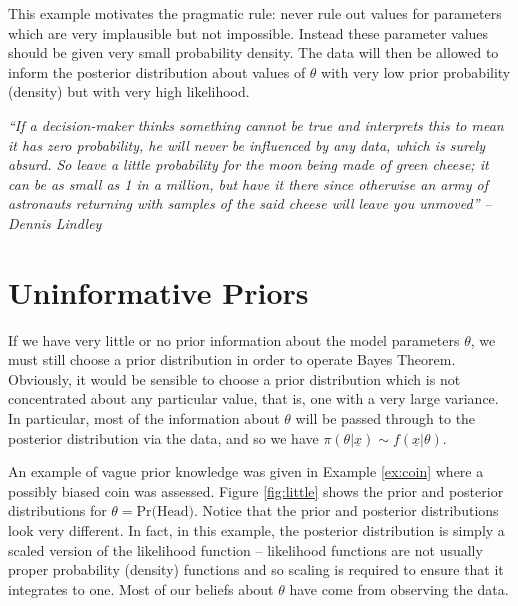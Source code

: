 This example motivates the pragmatic rule:
never rule out values for parameters which are very implausible but not impossible.
Instead these parameter values should be given very small probability density.
The data will then be allowed to inform the posterior distribution about values of $\theta$
with very low prior probability (density) but with very high likelihood.

\begin{tcolorbox}[colback=niceblue, colframe=niceblue]
\noindent \textit{``If a decision-maker thinks something cannot be true and interprets this to mean it has zero probability, he will never be influenced by any data, which is surely absurd. So leave a little probability for the moon being made of green cheese; it can be as small as 1 in a million, but have it there since otherwise an army of astronauts returning with samples of the said cheese will leave you unmoved''} \emph{-- Dennis Lindley}
\end{tcolorbox}

\clearpage
\section{Uninformative Priors}
If we have very little or no prior information about the model parameters $\theta$, we must still choose a prior distribution in order to operate Bayes Theorem. Obviously, it would be sensible to choose a prior distribution which is not concentrated about any particular value, that is, one with a very large variance. In particular, most of the information about $\theta$ will be passed through to the posterior distribution via the data, and so we have $\pi(\theta|\underline{x})\sim f(\underline{x}|\theta)$.

An example of vague prior knowledge was given in Example \ref{ex:coin} where a possibly biased coin was assessed. Figure \ref{fig:little} shows the prior and posterior distributions for $\theta=\text{Pr(Head)}$. Notice that the prior and posterior distributions look very different. In fact, in this example, the posterior distribution is simply a scaled version of the likelihood function -- likelihood functions are not usually proper probability (density) functions and so scaling is required to ensure that it integrates to one. Most of our beliefs about $\theta$ have come from observing the data.

